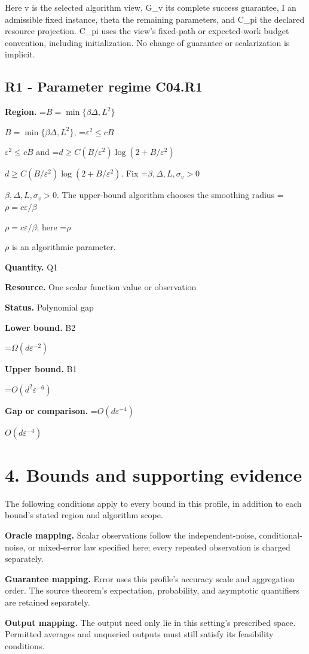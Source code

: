 \documentclass[10pt,a4paper]{article}
\newcommand{\AtlasMath}[1]{\par\begingroup\centering\setbox0=\hbox{$\displaystyle #1$}\ifdim\wd0>1.4\linewidth\typeout{ATLAS WIDE FORMULA: \the\wd0}\fi\ifdim\wd0>\linewidth\resizebox{\linewidth}{!}{\box0}\else\box0\fi\par\endgroup}
\newcommand{\AtlasInlineMath}[1]{\begingroup\setbox0=\hbox{$#1$}\ifdim\wd0>.4\linewidth\endgroup\AtlasMath{#1}\else\endgroup$#1$\fi}
\begin{document}
Here v is the selected algorithm view, G\_v its complete success guarantee, I an admissible fixed instance, theta the remaining parameters, and C\_pi the declared resource projection. C\_pi uses the view's fixed-path or expected-work budget convention, including initialization. No change of guarantee or scalarization is implicit.

\subsection{R1 - Parameter regime C04.R1}
\textbf{Region.} \AtlasInlineMath{B=\min\{\beta\Delta,L^2\}}, \AtlasInlineMath{\varepsilon^2\le cB} and \AtlasInlineMath{d\ge C(B/\varepsilon^2)\log(2+B/\varepsilon^2)}. Fix \AtlasInlineMath{\beta,\Delta,L,\sigma_v>0}. The upper-bound algorithm chooses the smoothing radius \AtlasInlineMath{\rho=c\varepsilon/\beta}; here \AtlasInlineMath{\rho} is an algorithmic parameter.

\textbf{Quantity.} Q1

\textbf{Resource.} One scalar function value or observation

\textbf{Status.} Polynomial gap

\textbf{Lower bound.} B2

\AtlasMath{\Omega(d\varepsilon^{-2})}
\textbf{Upper bound.} B1

\AtlasMath{O(d^2\varepsilon^{-6})}
\textbf{Gap or comparison.} \AtlasInlineMath{O(d\varepsilon^{-4})}

\section{4. Bounds and supporting evidence}
The following conditions apply to every bound in this profile, in addition to each bound's stated region and algorithm scope.

\textbf{Oracle mapping.} Scalar observations follow the independent-noise, conditional-noise, or mixed-error law specified here; every repeated observation is charged separately.

\textbf{Guarantee mapping.} Error uses this profile's accuracy scale and aggregation order. The source theorem's expectation, probability, and asymptotic quantifiers are retained separately.

\textbf{Output mapping.} The output need only lie in this setting's prescribed space. Permitted averages and unqueried outputs must still satisfy its feasibility conditions.
\end{document}

